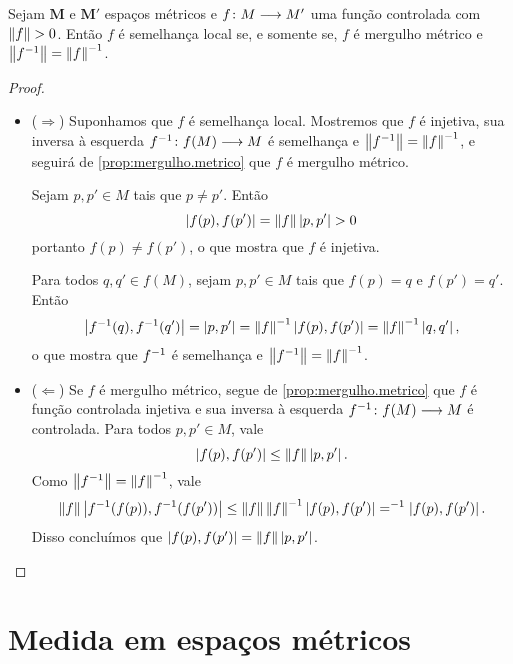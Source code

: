 \begin{proposition}
\label{prop:}
Sejam $\bm{M}$ e $\bm{M'}$ espaços métricos e ${f}\colon {M} \longrightarrow {M'}$ uma função controlada com $\left\Vert{f}\right\Vert>0$. Então $f$ é semelhança local se, e somente se, $f$ é mergulho métrico e $\left\Vert{f^{-1}}\right\Vert=\left\Vert{f}\right\Vert^{-1}$.
\end{proposition}
\begin{proof}
	\begin{itemize}
	\item ($\Rightarrow$) Suponhamos que $f$ é semelhança local. Mostremos que $f$ é injetiva, sua inversa à esquerda ${f^{-1}}\colon {f(M)} \longrightarrow {M}$ é semelhança e $\left\Vert{f^{-1}}\right\Vert=\left\Vert{f}\right\Vert^{-1}$, e seguirá de \ref{prop:mergulho.metrico} que $f$ é mergulho métrico.

	Sejam $p,p' \in M$ tais que $p \neq p'$. Então
		\begin{equation*}
		\left\vert{f(p)},{f(p')}\right\vert = \left\Vert{f}\right\Vert\left\vert{p},{p'}\right\vert > 0
		\end{equation*}
	portanto $f(p) \neq f(p')$, o que mostra que $f$ é injetiva.

	Para todos $q,q' \in f(M)$, sejam $p,p' \in M$ tais que $f(p)=q$ e $f(p')=q'$. Então
		\begin{equation*}
		\left\vert{f^{-1}(q)},{f^{-1}(q')}\right\vert = \left\vert{p},{p'}\right\vert = \left\Vert{f}\right\Vert^{-1}\left\vert{f(p)},{f(p')}\right\vert = \left\Vert{f}\right\Vert^{-1}\left\vert{q},{q'}\right\vert,
		\end{equation*}
	o que mostra que $f^{-1}$ é semelhança e $\left\Vert{f^{-1}}\right\Vert=\left\Vert{f}\right\Vert^{-1}$.

	\item ($\Leftarrow$) Se $f$ é mergulho métrico, segue de \ref{prop:mergulho.metrico} que $f$ é função controlada injetiva e sua inversa à esquerda ${f^{-1}}\colon {f(M)} \longrightarrow {M}$ é controlada. Para todos $p,p' \in M$, vale
		\begin{equation*}
		\left\vert{f(p)},{f(p')}\right\vert \leq \left\Vert{f}\right\Vert\left\vert{p},{p'}\right\vert.
		\end{equation*}
	Como $\left\Vert{f^{-1}}\right\Vert = \left\Vert{f}\right\Vert^{-1}$, vale
		\begin{equation*}
			\left\Vert{f}\right\Vert\left\vert{f^{-1}(f(p))},{f^{-1}(f(p'))}\right\vert \leq \left\Vert{f}\right\Vert\left\Vert{f}\right\Vert^{-1}\left\vert{f(p)},{f(p')}\right\vert = ^{-1}\left\vert{f(p)},{f(p')}\right\vert.
		\end{equation*}
	Disso concluímos que $\left\vert{f(p)},{f(p')}\right\vert = \left\Vert{f}\right\Vert\left\vert{p},{p'}\right\vert$.
	\qedhere
	\end{itemize}
\end{proof}




\section{Medida em espaços métricos}

